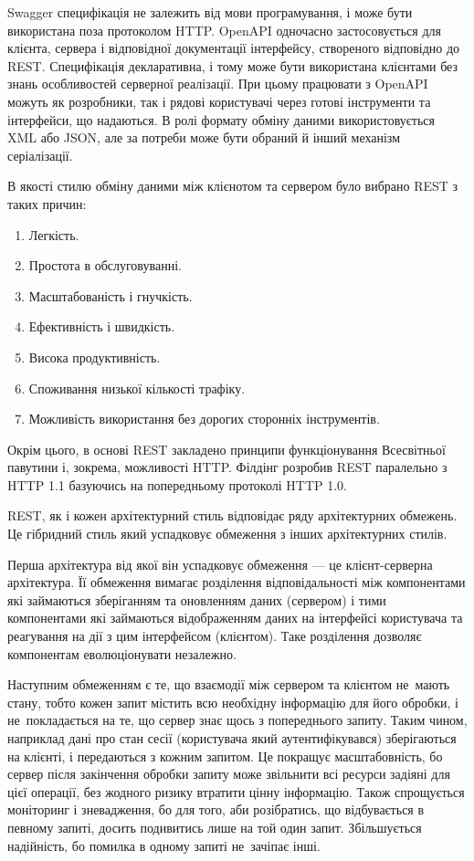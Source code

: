 \documentclass[../main.tex]{subfiles}
\begin{document}
Swagger специфікація не залежить від мови програмування, і може бути використана поза протоколом HTTP. OpenAPI одночасно застосовується для клієнта, сервера і відповідної документації інтерфейсу, створеного відповідно до REST. Специфікація декларативна, і тому може бути використана клієнтами без знань особливостей серверної реалізації. При цьому працювати з OpenAPI можуть як розробники, так і рядові користувачі через готові інструменти та інтерфейси, що надаються. В ролі формату обміну даними використовується XML або JSON, але за потреби може бути обраний й інший механізм серіалізації.

В якості стилю обміну даними між клієнотом та сервером було вибрано REST з таких причин:
\begin{enumerate}
	\item Легкість.
	\item Простота в обслуговуванні.
	\item Масштабованість і гнучкість.
	\item Ефективність і швидкість.
	\item Висока продуктивність.
	\item Споживання низької кількості трафіку.
	\item Можливість використання без дорогих сторонніх інструментів.
\end{enumerate}
Окрім цього, в основі REST закладено принципи функціонування Всесвітньої павутини і, зокрема, можливості HTTP. Філдінг розробив REST паралельно з HTTP 1.1 базуючись на попередньому протоколі HTTP 1.0.

REST, як і кожен архітектурний стиль відповідає ряду архітектурних обмежень. Це гібридний стиль який успадковує обмеження з інших архітектурних стилів.

Перша архітектура від якої він успадковує обмеження — це клієнт-серверна архітектура. Її обмеження вимагає розділення відповідальності між компонентами які займаються зберіганням та оновленням даних (сервером) і тими компонентами які займаються відображенням даних на інтерфейсі користувача та реагування на дії з цим інтерфейсом (клієнтом). Таке розділення дозволяє компонентам еволюціонувати незалежно.

Наступним обмеженням є те, що взаємодії між сервером та клієнтом не~мають стану, тобто кожен запит містить всю необхідну інформацію для його обробки, і не~покладається на те, що сервер знає щось з попереднього запиту. Таким чином, наприклад дані про стан сесії (користувача який аутентифікувався) зберігаються на клієнті, і передаються з кожним запитом. Це покращує масштабовність, бо сервер після закінчення обробки запиту може звільнити всі ресурси задіяні для цієї операції, без жодного ризику втратити цінну інформацію. Також спрощується моніторинг і зневадження, бо для того, аби розібратись, що відбувається в певному запиті, досить подивитись лише на той один запит. Збільшується надійність, бо помилка в одному запиті не~зачіпає інші.
\end{document}
